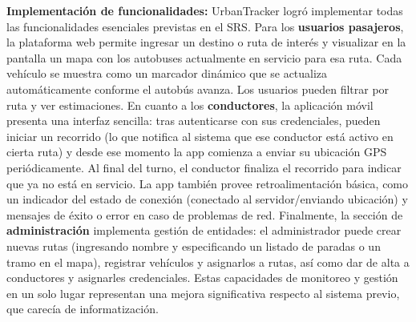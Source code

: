 \textbf{Implementación de funcionalidades:} UrbanTracker logró implementar todas las funcionalidades esenciales previstas en el SRS. Para los \textbf{usuarios pasajeros}, la plataforma web permite ingresar un destino o ruta de interés y visualizar en la pantalla un mapa con los autobuses actualmente en servicio para esa ruta. Cada vehículo se muestra como un marcador dinámico que se actualiza automáticamente conforme el autobús avanza. Los usuarios pueden filtrar por ruta y ver estimaciones. En cuanto a los \textbf{conductores}, la aplicación móvil presenta una interfaz sencilla: tras autenticarse con sus credenciales, pueden iniciar un recorrido (lo que notifica al sistema que ese conductor está activo en cierta ruta) y desde ese momento la app comienza a enviar su ubicación GPS periódicamente. Al final del turno, el conductor finaliza el recorrido para indicar que ya no está en servicio. La app también provee retroalimentación básica, como un indicador del estado de conexión (conectado al servidor/enviando ubicación) y mensajes de éxito o error en caso de problemas de red. Finalmente, la sección de \textbf{administración} implementa gestión de entidades: el administrador puede crear nuevas rutas (ingresando nombre y especificando un listado de paradas o un tramo en el mapa), registrar vehículos y asignarlos a rutas, así como dar de alta a conductores y asignarles credenciales. Estas capacidades de monitoreo y gestión en un solo lugar representan una mejora significativa respecto al sistema previo, que carecía de informatización.

